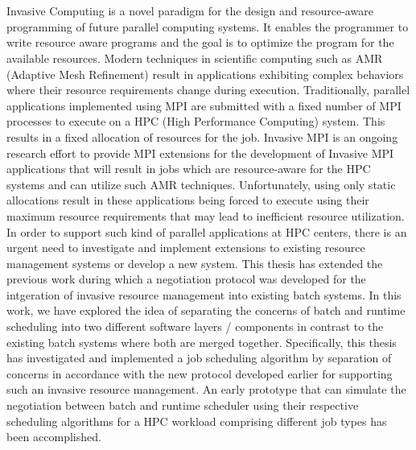 \chapter{\abstractname}
Invasive Computing is a novel paradigm for the design and resource-aware programming of future parallel computing systems. It enables the programmer to write resource aware programs and the goal is to optimize the program for the available resources. Modern techniques in scientific computing such as AMR (Adaptive Mesh Refinement) result in applications exhibiting complex behaviors where their resource requirements change during execution. Traditionally, parallel applications implemented using MPI are submitted with a fixed number of MPI processes to execute on a HPC (High Performance Computing) system. This results in a fixed allocation of resources for the job. Invasive MPI is an ongoing research effort to provide MPI extensions for the development of Invasive MPI applications that will result in jobs which are resource-aware for the HPC systems and can utilize such AMR techniques. Unfortunately, using only static allocations result in these applications being forced to execute using their maximum resource requirements that may lead to inefficient resource utilization. In order to support such kind of parallel applications at HPC centers, there is an urgent need to investigate and implement extensions to existing resource management systems or develop a new system. This thesis has extended the previous work during which a negotiation protocol was developed for the intgeration of invasive resource management into existing batch systems. In this work, we have explored the idea of separating the concerns of batch and runtime scheduling into two different software layers / components in contrast to the existing batch systems where both are merged together. Specifically, this thesis has investigated and implemented a job scheduling algorithm by separation of concerns in accordance with the new protocol developed earlier for supporting such an invasive resource management. An early prototype that can simulate the negotiation between batch and runtime scheduler using their respective scheduling algorithms for a HPC workload comprising different job types has been accomplished.\par



